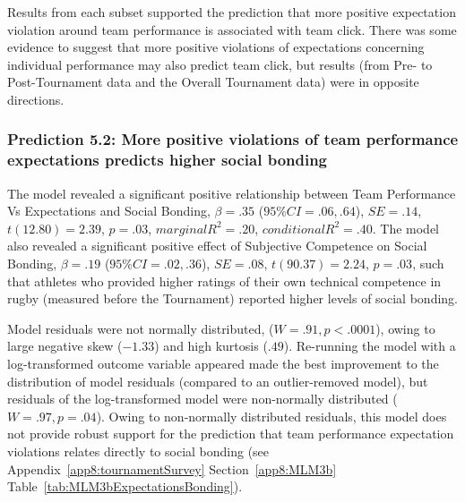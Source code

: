 \begin{CJK}{UTF8}{gbsn}
Results from each subset supported the prediction that more positive expectation violation around team performance is associated with team click.  There was some evidence to suggest that more positive violations of expectations concerning individual performance may also predict team click, but results (from Pre- to Post-Tournament data and the Overall Tournament data) were in
opposite directions.





\subsubsection{Prediction 5.2: More positive violations of team performance expectations predicts higher social bonding}
The model revealed a significant positive relationship between Team Performance Vs Expectations and Social Bonding, $\beta = .35$ ($95\% CI = .06, .64$), $SE = .14$, $t(12.80) = 2.39$, $p = .03$, $marginal R^2 = .20$, $conditional R^2 = .40$.  The model also revealed a significant positive effect of Subjective Competence on Social Bonding, $\beta = .19$ ($95\% CI =  .02, .36$), $SE = .08$, $t(90.37) = 2.24$, $p = .03$, such that athletes who provided higher ratings of their own technical competence in rugby (measured before the Tournament) reported higher levels of social bonding.

Model residuals were not normally distributed, ($W = .91, p < .0001$), owing to large negative skew ($-1.33$) and high kurtosis ($.49$). Re-running the model with a log-transformed outcome variable appeared made the best improvement to the distribution of model residuals (compared to an outlier-removed model), but residuals of the log-transformed model were non-normally distributed ($W = .97, p = .04$).  Owing to non-normally distributed residuals, this model does not provide robust support for the prediction that team performance expectation violations relates directly to social bonding (see Appendix~\ref{app8:tournamentSurvey} Section~\ref{app8:MLM3b} Table~\ref{tab:MLM3bExpectationsBonding}).








\end{CJK}
